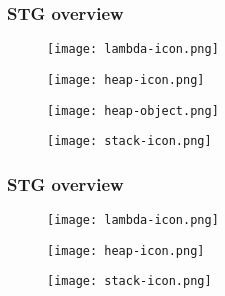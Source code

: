 \documentclass[bigger]{beamer}
\begin{document}
\begin{frame}[fragile]
\frametitle{STG overview}
\begin{center}

	\begin{minipage}{0.15\textwidth}
		\begin{figure}
			\texttt{[image: lambda-icon.png]}
		\end{figure}
	\end{minipage}
	\hfill
	\begin{minipage}{0.30\textwidth}
		\vspace{1cm}
		\begin{figure}
			\texttt{[image: heap-icon.png]}
		\end{figure}
		\vspace{-1cm}
		\begin{figure}
			\texttt{[image: heap-object.png]}
		\end{figure}
	\end{minipage}
	\hfill
	\begin{minipage}{0.30\textwidth}
		\begin{figure}
			\texttt{[image: stack-icon.png]}
		\end{figure}
	\end{minipage}

\end{center}
\end{frame}

\begin{frame}[fragile]
\frametitle{STG overview}
\begin{center}

	\begin{minipage}{0.25\textwidth}
		\begin{figure}
			\texttt{[image: lambda-icon.png]}
		\end{figure}
	\end{minipage}
	\hfill
	\begin{minipage}{0.30\textwidth}
		\begin{figure}
			\texttt{[image: heap-icon.png]}
		\end{figure}
	\end{minipage}
	\hfill
	\begin{minipage}{0.30\textwidth}
		\begin{figure}
			\texttt{[image: stack-icon.png]}
		\end{figure}
	\end{minipage}

\end{center}
\end{frame}
\end{document}
